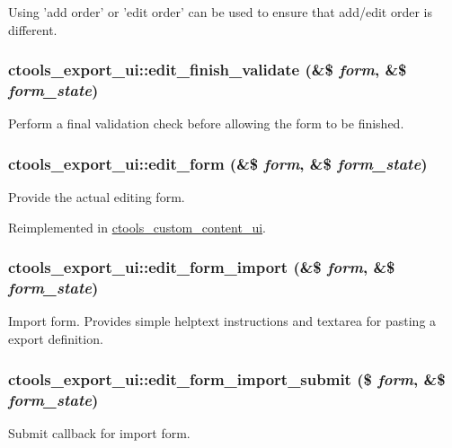 Using 'add order' or 'edit order' can be used to ensure that add/edit order is different. \hypertarget{classctools__export__ui_a1354b4542ef5a4085bcbd3026c7d4527}{
\subsubsection[{edit\_\-finish\_\-validate}]{\setlength{\rightskip}{0pt plus 5cm}ctools\_\-export\_\-ui::edit\_\-finish\_\-validate (\&\$ {\em form}, \/  \&\$ {\em form\_\-state})}}
\label{classctools__export__ui_a1354b4542ef5a4085bcbd3026c7d4527}
Perform a final validation check before allowing the form to be finished. \hypertarget{classctools__export__ui_a183bc5e2bb1c4c48aedbd1754c5a0058}{
\subsubsection[{edit\_\-form}]{\setlength{\rightskip}{0pt plus 5cm}ctools\_\-export\_\-ui::edit\_\-form (\&\$ {\em form}, \/  \&\$ {\em form\_\-state})}}
\label{classctools__export__ui_a183bc5e2bb1c4c48aedbd1754c5a0058}
Provide the actual editing form. 

Reimplemented in \hyperlink{classctools__custom__content__ui_ab0aa3104e4e701edbf82939f4d07b866}{ctools\_\-custom\_\-content\_\-ui}.\hypertarget{classctools__export__ui_ab8fc39fc23ac13d24db430913170aa18}{
\subsubsection[{edit\_\-form\_\-import}]{\setlength{\rightskip}{0pt plus 5cm}ctools\_\-export\_\-ui::edit\_\-form\_\-import (\&\$ {\em form}, \/  \&\$ {\em form\_\-state})}}
\label{classctools__export__ui_ab8fc39fc23ac13d24db430913170aa18}
Import form. Provides simple helptext instructions and textarea for pasting a export definition. \hypertarget{classctools__export__ui_a0acf116d80efec9b4d85c9bc0a4118d7}{
\subsubsection[{edit\_\-form\_\-import\_\-submit}]{\setlength{\rightskip}{0pt plus 5cm}ctools\_\-export\_\-ui::edit\_\-form\_\-import\_\-submit (\$ {\em form}, \/  \&\$ {\em form\_\-state})}}
\label{classctools__export__ui_a0acf116d80efec9b4d85c9bc0a4118d7}
Submit callback for import form.

